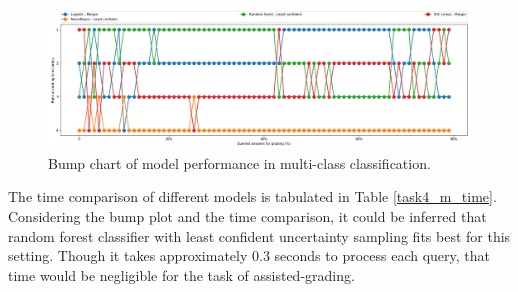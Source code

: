 \begin{figure}[h]
	\centering
	\includegraphics[scale=0.3]{images/task4_rank}
	\caption{Bump chart of model performance in multi-class classification.}
	\label{t4_m_bump}
\end{figure}



The time comparison of different models is tabulated in Table \ref{task4_m_time}. Considering the bump plot and the time comparison, it could be inferred that random forest classifier with least confident uncertainty sampling fits best for this setting. Though it takes approximately 0.3 seconds to process each query, that time would be negligible for the task of assisted-grading.

